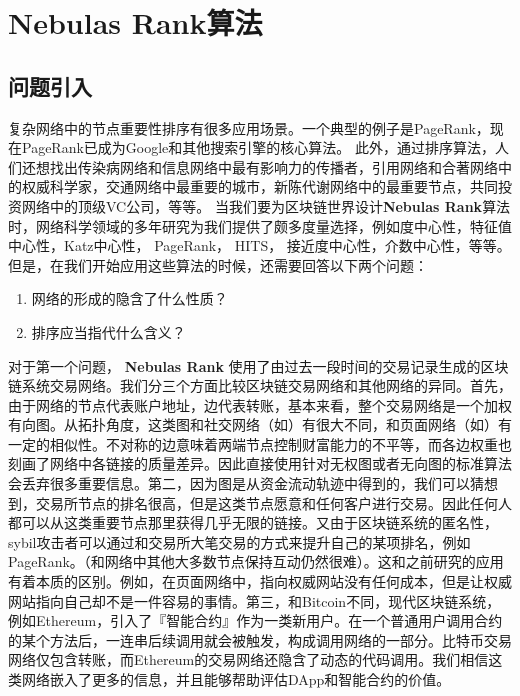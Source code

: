 \section{Nebulas Rank算法}


\subsection{问题引入} \label{sec:intro}
复杂网络中的节点重要性排序有很多应用场景。一个典型的例子是PageRank\cite{Brin2010}\cite{page1999pagerank}，现在PageRank已成为Google和其他搜索引擎的核心算法\cite{langville2011google}。 此外，通过排序算法，人们还想找出传染病网络和信息网络中最有影响力的传播者\cite{doerr2012rumors}\cite{Kitsak2010}，引用网络和合著网络中的权威科学家\cite{walker2007ranking}\cite{chen2007finding}\cite{Radicchi2009}，交通网络中最重要的城市\cite{guimera2005worldwide}，新陈代谢网络中的最重要节点\cite{ivan2010web}，共同投资网络中的顶级VC公司\cite{Bhat2012}，等等。 当我们要为区块链世界设计\textbf{Nebulas Rank}算法时，网络科学领域的多年研究为我们提供了颇多度量选择，例如度中心性\cite{freeman1979set}，特征值中心性\cite{bonacich1972factoring}，Katz中心性\cite{katz1953new}， PageRank\cite{Brin2010}， HITS\cite{kleinberg1999authoritative}， 接近度中心性\cite{sabidussi1966centrality}，介数中心性\cite{freeman1977set}\cite{freeman1978centrality}\cite{freeman1991centrality}\cite{noh2004random}\cite{newman2005measure}，等等。 但是，在我们开始应用这些算法的时候，还需要回答以下两个问题：
\begin{enumerate}
\item 网络的形成的隐含了什么性质？
\item 排序应当指代什么含义？
\end{enumerate}

对于第一个问题， \textbf{Nebulas Rank} 使用了由过去一段时间的交易记录生成的区块链系统交易网络。我们分三个方面比较区块链交易网络和其他网络的异同。首先，由于网络的节点代表账户地址，边代表转账，基本来看，整个交易网络是一个加权有向图。从拓扑角度，这类图和社交网络（如\cite{Ugander2011}）有很大不同，和页面网络（如\cite{page1999pagerank}）有一定的相似性。不对称的边意味着两端节点控制财富能力的不平等，而各边权重也刻画了网络中各链接的质量差异。因此直接使用针对无权图或者无向图的标准算法会丢弃很多重要信息。第二，因为图是从资金流动轨迹中得到的，我们可以猜想到，交易所节点的排名很高，但是这类节点愿意和任何客户进行交易。因此任何人都可以从这类重要节点那里获得几乎无限的链接。又由于区块链系统的匿名性，sybil攻击者可以通过和交易所大笔交易的方式来提升自己的某项排名，例如PageRank。（和网络中其他大多数节点保持互动仍然很难）。这和之前研究的应用有着本质的区别。例如，在页面网络中，指向权威网站没有任何成本，但是让权威网站指向自己却不是一件容易的事情。第三，和Bitcoin\cite{Nakamoto2008}不同，现代区块链系统，例如Ethereum\cite{Wood2014}，引入了『智能合约』作为一类新用户。在一个普通用户调用合约的某个方法后，一连串后续调用就会被触发，构成调用网络的一部分。比特币交易网络仅包含转账，而Ethereum的交易网络还隐含了动态的代码调用。我们相信这类网络嵌入了更多的信息，并且能够帮助评估DApp和智能合约的价值。

